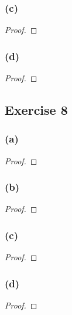 \documentclass[14pt]{extarticle}
\begin{document}
\subsubsection{(c)}

\begin{proof}

\end{proof}

\subsubsection{(d)}

\begin{proof}

\end{proof}

\subsection{Exercise 8}

\subsubsection{(a)}

\begin{proof}

\end{proof}

\subsubsection{(b)}

\begin{proof}

\end{proof}

\subsubsection{(c)}

\begin{proof}

\end{proof}

\subsubsection{(d)}

\begin{proof}

\end{proof}
\end{document}
